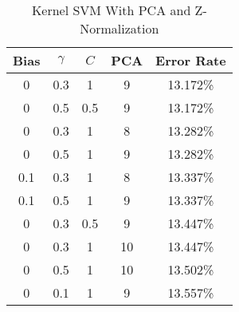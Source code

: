 \begin{center}
\begin{longtable}{|c|c|c|c|c|}
\caption{Kernel SVM With PCA and Z-Normalization}\label{tab:svm_rbfpcan_acctable}\\
\hline
Bias & $\gamma$ & $C$ & PCA & Error Rate \\
\hline
0 & 0.3 & 1 & 9 & 13.172\% \\
\hline
0 & 0.5 & 0.5 & 9 & 13.172\% \\
\hline
0 & 0.3 & 1 & 8 & 13.282\% \\
\hline
0 & 0.5 & 1 & 9 & 13.282\% \\
\hline
0.1 & 0.3 & 1 & 8 & 13.337\% \\
\hline
0.1 & 0.5 & 1 & 9 & 13.337\% \\
\hline
0 & 0.3 & 0.5 & 9 & 13.447\% \\
\hline
0 & 0.3 & 1 & 10 & 13.447\% \\
\hline
0 & 0.5 & 1 & 10 & 13.502\% \\
\hline
0 & 0.1 & 1 & 9 & 13.557\% \\
\hline
\end{longtable}
\end{center}
